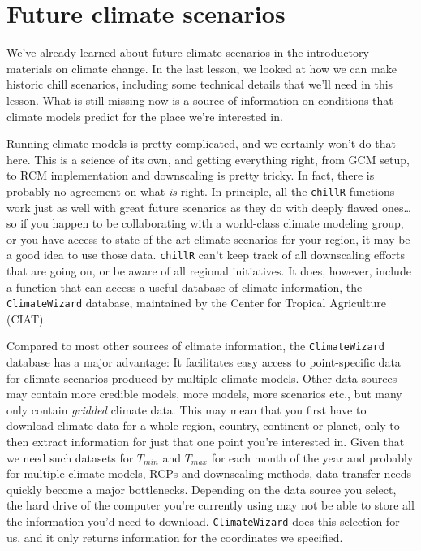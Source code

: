 \documentclass[
]{book}
\begin{document}
\hypertarget{future-climate-scenarios}{%
\section{Future climate scenarios}\label{future-climate-scenarios}}

We've already learned about future climate scenarios in the introductory materials on climate change. In the last lesson, we looked at how we can make historic chill scenarios, including some technical details that we'll need in this lesson. What is still missing now is a source of information on conditions that climate models predict for the place we're interested in.

Running climate models is pretty complicated, and we certainly won't do that here. This is a science of its own, and getting everything right, from GCM setup, to RCM implementation and downscaling is pretty tricky. In fact, there is probably no agreement on what \emph{is} right. In principle, all the \texttt{chillR} functions work just as well with great future scenarios as they do with deeply flawed ones\ldots{} so if you happen to be collaborating with a world-class climate modeling group, or you have access to state-of-the-art climate scenarios for your region, it may be a good idea to use those data. \texttt{chillR} can't keep track of all downscaling efforts that are going on, or be aware of all regional initiatives. It does, however, include a function that can access a useful database of climate information, the \texttt{ClimateWizard} database, maintained by the Center for Tropical Agriculture (CIAT).

Compared to most other sources of climate information, the \texttt{ClimateWizard} database has a major advantage: It facilitates easy access to point-specific data for climate scenarios produced by multiple climate models. Other data sources may contain more credible models, more models, more scenarios etc., but many only contain \emph{gridded} climate data. This may mean that you first have to download climate data for a whole region, country, continent or planet, only to then extract information for just that one point you're interested in. Given that we need such datasets for \(T_{min}\) and \(T_{max}\) for each month of the year and probably for multiple climate models, RCPs and downscaling methods, data transfer needs quickly become a major bottlenecks. Depending on the data source you select, the hard drive of the computer you're currently using may not be able to store all the information you'd need to download. \texttt{ClimateWizard} does this selection for us, and it only returns information for the coordinates we specified.
\end{document}
